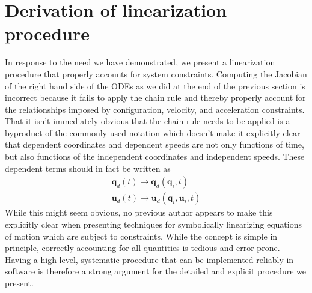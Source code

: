 \documentclass[smallcondensed,final]{svjour3}                     %
\begin{document}
\section{Derivation of linearization procedure}
\label{sec:derivations}
In response to the need we have demonstrated, we present a linearization
procedure that properly accounts for system constraints. Computing the Jacobian
of the right hand side of the ODEs as we did at the end of the previous
section is incorrect because it fails to apply the chain rule and thereby
properly account for the relationships imposed by configuration, velocity, and
acceleration constraints. That it isn't immediately obvious that the chain rule
needs to be applied is a byproduct of the commonly used notation which doesn't
make it explicitly clear that dependent coordinates and dependent speeds are not
only functions of time, but also functions of the independent coordinates and
independent speeds. These dependent terms should in fact be written as
\begin{align}
\label{eq:q_d_redefined}
\mathbf{q}_d (t) \to \mathbf{q}_d (\mathbf{q}_i, t) \\
\label{eq:u_d_redefined}
\mathbf{u}_d (t) \to \mathbf{u}_d (\mathbf{q}_i, \mathbf{u}_i, t)
\end{align}
While this might seem obvious, no previous author appears to make this
explicitly clear when presenting techniques for symbolically linearizing
equations of motion which are subject to constraints. While the concept is
simple in principle, correctly accounting for all quantities is tedious and
error prone. Having a high level, systematic procedure that can be implemented
reliably in software is therefore a strong argument for the detailed and
explicit procedure we present.
\end{document}
